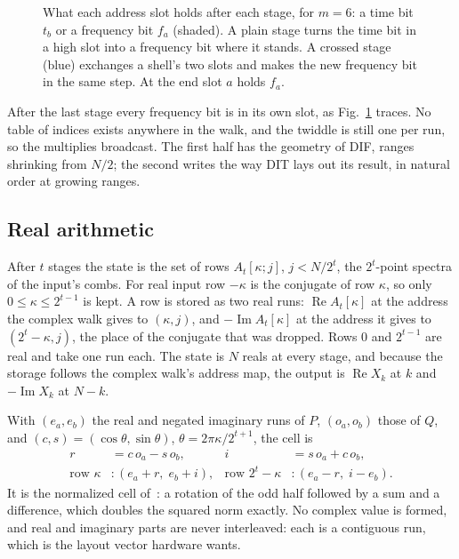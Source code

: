 \documentclass[conference]{IEEEtran}
\newcommand{\re}{\operatorname{Re}}
\newcommand{\im}{\operatorname{Im}}
\begin{document}
\begin{figure}[t]
\centering

\caption{What each address slot holds after each stage, for $m=6$: a time bit $t_b$ or a frequency bit $f_a$ (shaded). A plain stage turns the time bit in a high slot into a frequency bit where it stands. A crossed stage (blue) exchanges a shell's two slots and makes the new frequency bit in the same step. At the end slot $a$ holds $f_a$.}
\label{fig:slots}
\end{figure}

After the last stage every frequency bit is in its own slot, as Fig.~\ref{fig:slots} traces.
No table of indices exists anywhere in the walk, and the twiddle is still one per run, so the multiplies broadcast.
The first half has the geometry of DIF, ranges shrinking from $N/2$; the second writes the way DIT lays out its result, in natural order at growing ranges.

\subsection{Real arithmetic}\label{sec:real}

After $t$ stages the state is the set of rows $A_t[\kappa;j]$, $j<N/2^t$, the $2^t$-point spectra of the input's combs.
For real input row $-\kappa$ is the conjugate of row $\kappa$, so only $0\le\kappa\le2^{t-1}$ is kept.
A row is stored as two real runs: $\re A_t[\kappa]$ at the address the complex walk gives to $(\kappa,j)$, and $-\im A_t[\kappa]$ at the address it gives to $(2^t-\kappa,j)$, the place of the conjugate that was dropped.
Rows $0$ and $2^{t-1}$ are real and take one run each.
The state is $N$ reals at every stage, and because the storage follows the complex walk's address map, the output is $\re X_k$ at $k$ and $-\im X_k$ at $N-k$.

With $(e_a,e_b)$ the real and negated imaginary runs of $P$, $(o_a,o_b)$ those of $Q$, and $(c,s)=(\cos\theta,\sin\theta)$, $\theta=2\pi\kappa/2^{t+1}$, the cell is
\begin{equation}\label{eq:cell}
\begin{aligned}
r&=c\,o_a-s\,o_b, & i&=s\,o_a+c\,o_b,\\
\text{row }\kappa&:(e_a+r,\;e_b+i), & \text{row }2^t{-}\kappa&:(e_a-r,\;i-e_b).
\end{aligned}
\end{equation}
It is the normalized cell of~\cite{obr}: a rotation of the odd half followed by a sum and a difference, which doubles the squared norm exactly.
No complex value is formed, and real and imaginary parts are never interleaved: each is a contiguous run, which is the layout vector hardware wants.
\end{document}
